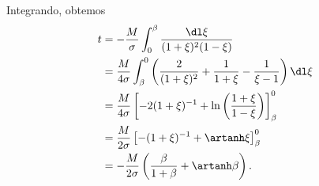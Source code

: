 Integrando, obtemos
\begin{align*}
    t &= -\frac{M}{\sigma} \int_0^\beta \frac{\dl\xi}{(1+\xi)^2(1-\xi)}\\
      &= \frac{M}{4\sigma} \int_\beta^0 \left(\frac{2}{(1+\xi)^2} + \frac{1}{1+\xi} - \frac{1}{\xi - 1}\right)\dl\xi\\
      &= \frac{M}{4 \sigma} \left[-2(1+\xi)^{-1} + \ln{\left(\frac{1+\xi}{1-\xi}\right)}\right]_\beta^0\\
      &= \frac{M}{2 \sigma} \left[-(1+\xi)^{-1} + \artanh\xi\right]_\beta^0\\
      &= -\frac{M}{2 \sigma} \left(\frac{\beta}{1+\beta} + \artanh\beta\right).
\end{align*}

